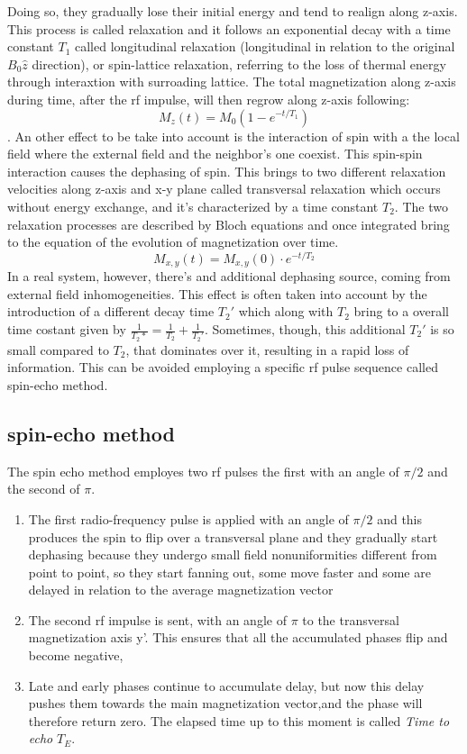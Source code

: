 \documentclass[a4paper,11pt]{article}
\begin{document}
Doing so, they gradually lose their initial energy and tend to realign along z-axis.
This process is called relaxation and it follows an exponential decay with a time constant $T_1$ called longitudinal relaxation (longitudinal in relation to the original $B_0 \hat z$ direction), or spin-lattice relaxation, referring to the loss of thermal energy through interaxtion with surroading lattice. The total magnetization along z-axis during time, after the rf impulse, will then regrow along z-axis following:
\begin{equation}
M_z(t) = M_0 (1-e^{-t/T_1})
\end{equation}.
An other effect to be take into account is the interaction of spin with a the local field where the external field and the neighbor's one coexist. This spin-spin interaction causes the dephasing of spin. This brings to two different relaxation velocities along z-axis and x-y plane called transversal relaxation which occurs without energy exchange, and it's characterized by a time constant $T_2$. The two relaxation processes are described by Bloch equations and once integrated bring to the equation of the evolution of magnetization over time.
\begin{equation}
M_{x, y}(t) = M_{x,y}(0)\cdot e^{-t/T_2}
\end{equation}
In a real system, however, there's and additional dephasing source, coming from external field inhomogeneities.
This effect is often taken into account by the introduction of a different decay time $T_2'$ which along with $T_2$ bring to a overall time costant given by $\frac{1}{T_2*} = \frac{1}{T_2}+\frac{1}{T_2'}$.
Sometimes, though, this additional $T_2'$ is so small compared to $T_2$, that dominates over it, resulting in a rapid loss of information.
This can be avoided employing a specific rf pulse sequence called spin-echo method.
\subsection{spin-echo method}
The spin echo method employes two rf pulses the first with an angle of $\pi/2$ and the second of $\pi$.
\begin{enumerate}
\item The first radio-frequency pulse is applied with an angle of $\pi/2$ and this produces the spin to flip over a transversal plane and they gradually start dephasing because they undergo small field nonuniformities different from point to point, so they start fanning out, some move faster and some are delayed in relation to the average magnetization vector
\item The second rf impulse is sent, with an angle of $\pi$ to the transversal magnetization axis y'. This ensures that all the accumulated phases flip and become negative,
\item Late and early phases continue to accumulate delay, but now this delay pushes them towards the main magnetization vector,and the phase will therefore return zero. The elapsed time up to this moment is called \emph{Time to echo} $T_E$.
\end{enumerate}
\end{document}
